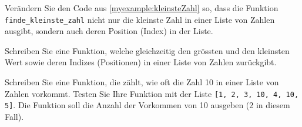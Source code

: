 \begin{myexercise}
	Verändern Sie den Code aus \cref{myexample:kleinsteZahl} so, dass die Funktion \lstinline|finde_kleinste_zahl| nicht nur die kleinste Zahl in einer Liste von Zahlen ausgibt, sondern auch deren Position (Index) in der Liste.
	\begin{myanswer}
		
	\end{myanswer}
\end{myexercise}

\begin{myexercise}
	Schreiben Sie eine Funktion, welche gleichzeitig den grössten und den kleinsten Wert sowie deren Indizes (Positionen) in einer Liste von Zahlen zurückgibt.
	\begin{myanswer}
		
	\end{myanswer}
\end{myexercise}

\begin{myexercise}
	Schreiben Sie eine Funktion, die zählt, wie oft die Zahl 10 in einer Liste von Zahlen vorkommt. Testen Sie Ihre Funktion mit der Liste \lstinline|[1, 2, 3, 10, 4, 10, 5]|. Die Funktion soll die Anzahl der Vorkommen von 10 ausgeben (2 in diesem Fall).
	\begin{myanswer}
		
	\end{myanswer}
\end{myexercise}

